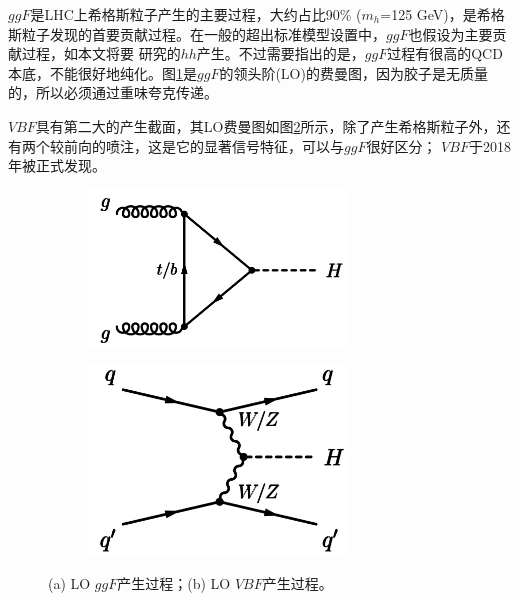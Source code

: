 $ggF$是LHC上希格斯粒子产生的主要过程，大约占比90\% ($m_h$=125 GeV)，是希格斯粒子发现的首要贡献过程。在一般的超出标准模型设置中，$ggF$也假设为主要贡献过程，如本文将要
研究的$hh$产生。不过需要指出的是，$ggF$过程有很高的QCD本底，不能很好地纯化。图\ref{fig:diagram_ggF}是$ggF$的领头阶(LO)的费曼图，因为胶子是无质量的，所以必须通过重味夸克传递。

$VBF$具有第二大的产生截面，其LO费曼图如图\ref{fig:diagram_VBF}所示，除了产生希格斯粒子外，还有两个较前向的喷注，这是它的显著信号特征，可以与$ggF$很好区分；
$VBF$于2018年被正式发现\cite{ATLAS:2018doi}。
\begin{figure}[h]
\centering
 \begin{subfigure}[b]{0.45\textwidth}
  \includegraphics[width=0.75\textwidth]{fig/diagram_ggF.png}
  \caption{}
  \label{fig:diagram_ggF}
 \end{subfigure}
 \begin{subfigure}[b]{0.45\textwidth}
  \includegraphics[width=0.75\textwidth]{fig/diagram_VBF.png}
  \caption{}
  \label{fig:diagram_VBF}
 \end{subfigure}
\caption{(a) LO $ggF$产生过程；(b) LO $VBF$产生过程。}
\label{fig:ggF_VBF}
\end{figure}

